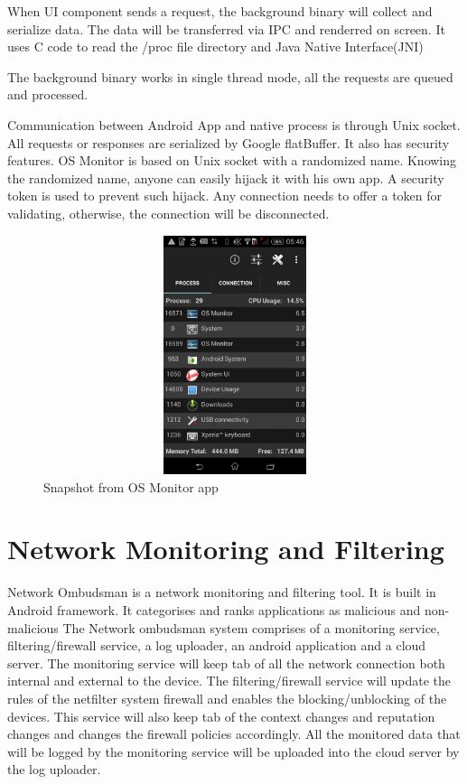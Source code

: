 \documentclass[12pt]{report}
\begin{document}
When UI component sends a request, the background binary will collect and serialize data. The data will be transferred via IPC and renderred on screen. It uses \textquotesingle C \textquotesingle code to read the /proc file directory and Java Native Interface(JNI)

The background binary works in single thread mode, all the requests are queued and processed. 

Communication between Android App and native process is through Unix socket. All requests or responses are serialized by Google flatBuffer.
It also has security features.
OS Monitor is based on Unix socket with a randomized name. Knowing the randomized name, anyone can easily hijack it with his own app. A security token is used to prevent such hijack. Any connection needs to offer a token for validating, otherwise, the connection will be disconnected. 

\begin{figure}
	\centering
	\includegraphics[width=1.0\textwidth,width=5cm,height=7cm]{os_mon.png}
	\caption{Snapshot from OS Monitor app}
\end{figure}
\section{Network Monitoring and Filtering}
Network Ombudsman \citep{Nikhil2015}  is a network monitoring and filtering tool.
It is built in Android  framework.
It categorises and ranks applications as malicious and non-malicious
The Network ombudsman system comprises of a monitoring service, filtering/firewall
service, a log uploader, an android application and a cloud server. 
The monitoring
service will keep tab of all the network connection both internal and external
to the device. The filtering/firewall service will update the rules of the netfilter
system firewall and enables the blocking/unblocking of the devices. This service
will also keep tab of the context changes and reputation changes and changes the
firewall policies accordingly. All the monitored data that will be logged by the
monitoring service will be uploaded into the cloud server by the log uploader.
\end{document}
